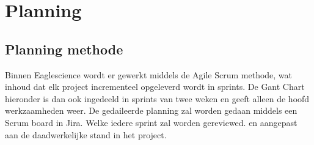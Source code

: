 
\chapter{Planning} %

\label{planning} %

\section{Planning methode}
Binnen Eaglescience wordt er gewerkt middels de Agile Scrum methode, wat inhoud dat elk project incrementeel opgeleverd wordt in sprints. De Gant Chart hieronder is dan ook ingedeeld in sprints van twee weken en geeft alleen de hoofd werkzaamheden weer. De gedaileerde planning zal worden gedaan middels een Scrum board in Jira. Welke iedere sprint zal worden gereviewed. en aangepast aan de daadwerkelijke stand in het project.

